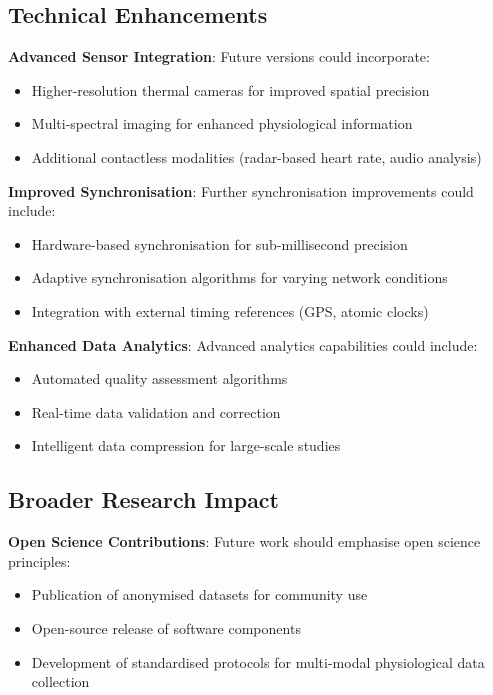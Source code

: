 \subsection{Technical Enhancements}

\textbf{Advanced Sensor Integration}: Future versions could incorporate:

\begin{itemize}
\item Higher-resolution thermal cameras for improved spatial precision
\item Multi-spectral imaging for enhanced physiological information
\item Additional contactless modalities (radar-based heart rate, audio analysis)
\end{itemize}

\textbf{Improved Synchronisation}: Further synchronisation improvements could include:

\begin{itemize}
\item Hardware-based synchronisation for sub-millisecond precision
\item Adaptive synchronisation algorithms for varying network conditions
\item Integration with external timing references (GPS, atomic clocks)
\end{itemize}

\textbf{Enhanced Data Analytics}: Advanced analytics capabilities could include:

\begin{itemize}
\item Automated quality assessment algorithms
\item Real-time data validation and correction
\item Intelligent data compression for large-scale studies
\end{itemize}

\subsection{Broader Research Impact}

\textbf{Open Science Contributions}: Future work should emphasise open science principles:

\begin{itemize}
\item Publication of anonymised datasets for community use
\item Open-source release of software components
\item Development of standardised protocols for multi-modal physiological data collection
\end{itemize}


